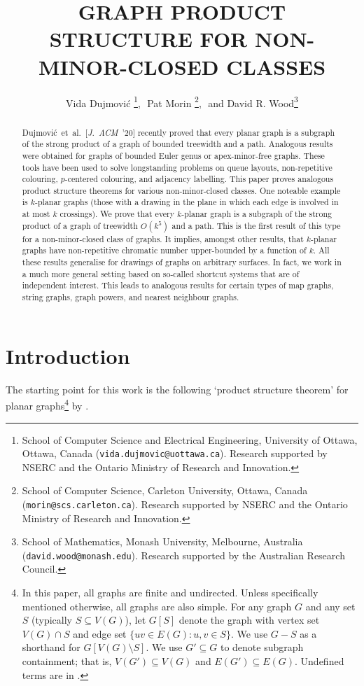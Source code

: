 \documentclass{patmorin}
\title{\MakeUppercase{Graph Product Structure for Non-Minor-Closed Classes}}
\author{Vida Dujmovi\'c%
        \thanks{School of Computer Science and Electrical Engineering,
                University of Ottawa, Ottawa, Canada (\texttt{vida.dujmovic@uottawa.ca}).
                Research supported by NSERC and the Ontario Ministry of Research and Innovation.},\,\,
        Pat Morin%
        \thanks{School of Computer Science, Carleton University, Ottawa, Canada (\texttt{morin@scs.carleton.ca}). Research  supported by NSERC and the Ontario Ministry of Research and Innovation.},\,\, and
        David R. Wood\thanks{School of Mathematics, Monash University, Melbourne, Australia (\texttt{david.wood@monash.edu}). Research supported by the Australian Research Council.}
}
\begin{document}
\begin{titlepage}
\maketitle

\begin{abstract}
Dujmovi\'c~et~al.~[\emph{J.~ACM}~'20] recently proved that every planar graph is a subgraph of the strong product of a graph of bounded treewidth and a path. Analogous results were obtained for graphs of bounded Euler genus or apex-minor-free graphs. These tools have been used to solve longstanding problems on queue layouts, non-repetitive colouring, $p$-centered colouring, and adjacency labelling. This paper proves analogous product structure theorems for various non-minor-closed classes. One noteable example is $k$-planar graphs (those with a drawing in the plane in which each edge is involved in at most $k$ crossings). We prove that every $k$-planar graph is a subgraph of the strong product of a graph of treewidth $O(k^5)$ and a path. This is the first result of this type for a non-minor-closed class of graphs. It implies, amongst other results, that $k$-planar graphs have non-repetitive chromatic number upper-bounded by a function of $k$. All these results generalise for drawings of graphs on arbitrary surfaces. In fact, we work in a much more general setting based on so-called shortcut systems that are of independent interest. This leads to analogous results for certain types of map graphs, string graphs, graph powers, and nearest neighbour graphs. 
\end{abstract}
\end{titlepage}
\tableofcontents
\newpage

\section{Introduction}
\label{Introduction}

The starting point for this work is the following `product structure theorem' for planar graphs\footnote{In this paper, all graphs are finite and undirected. Unless specifically mentioned otherwise, all graphs are also simple. For any graph $G$ and any set $S$ (typically $S\subseteq V(G)$), let $G[S]$  denote the graph with vertex set $V(G)\cap S$ and edge set $\{uv\in E(G) : u,v\in S\}$.  We use $G-S$ as a shorthand for $G[V(G)\setminus S]$. We use $G'\subseteq G$ to denote subgraph containment; that is, $V(G')\subseteq V(G)$ and $E(G')\subseteq E(G)$. Undefined terms are in \citep{Diestel5}.} by \citet{DJMMUW20}.
\end{document}
